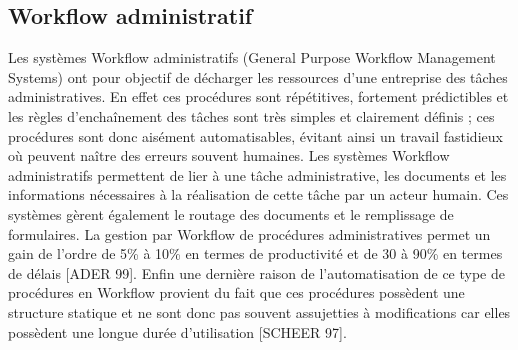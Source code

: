 \subsection{Workflow administratif }
Les systèmes Workflow administratifs (General Purpose Workflow Management Systems) ont pour objectif de décharger les ressources d’une entreprise des tâches administratives. En effet ces procédures sont répétitives, fortement prédictibles et les règles
d’enchaînement des tâches sont très simples et clairement définis ; ces procédures sont donc
aisément automatisables, évitant ainsi un travail fastidieux où peuvent naître des erreurs souvent humaines. Les systèmes Workflow administratifs permettent de lier à une tâche administrative, les documents et les informations nécessaires à la réalisation de cette tâche par un acteur humain. Ces systèmes gèrent également le routage des documents et le remplissage de
formulaires. La gestion par Workflow de procédures administratives permet un gain de
l’ordre de 5\% à 10\% en termes de productivité et de 30 à 90\% en termes de délais [ADER
99]. Enfin une dernière raison de l’automatisation de ce type de procédures en Workflow provient du fait que ces procédures possèdent une structure statique et ne sont donc pas souvent
assujetties à modifications car elles possèdent une longue durée d’utilisation [SCHEER 97]. 
